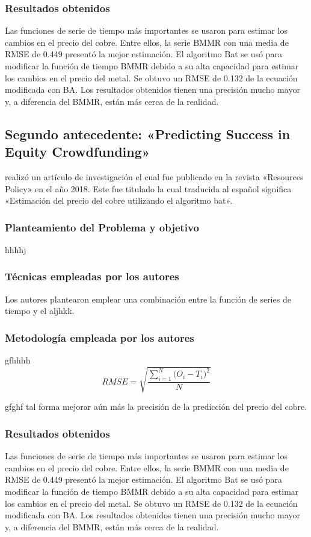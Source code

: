 \subsubsection{Resultados obtenidos}
Las funciones de serie de tiempo más importantes se usaron para estimar los cambios en el precio del cobre. Entre ellos, la serie BMMR con una media de RMSE de 0.449 presentó la mejor estimación. El algoritmo Bat  se usó para modificar la función de tiempo BMMR debido a su alta capacidad para estimar los cambios en el precio del metal. Se obtuvo un RMSE de 0.132 de la ecuación modificada con BA. Los resultados obtenidos tienen una precisión mucho mayor y, a diferencia del BMMR, están más cerca de la realidad.


\subsection{Segundo antecedente: «Predicting Success in Equity Crowdfunding» \citep*{pr_beckwith2016predcrowd}}
\citeauthor{pr_beckwith2016predcrowd} realizó un artículo de investigación el cual fue publicado en la revista «Resources Policy» en el año 2018. Este fue titulado  la cual traducida al español significa «Estimación del precio del cobre utilizando el algoritmo bat».

\subsubsection{Planteamiento del Problema y objetivo }
hhhhj

\subsubsection{Técnicas empleadas por los autores}
Los autores plantearon emplear una combinación entre la función de series de tiempo y el aljhkk. 

\subsubsection{Metodología empleada por los autores}
gfhhhh
\begin{equation}  
\label{eq:RMSE}
RMSE = \sqrt{\frac{\sum_{i=1}^{N}{\Big(O_i -T_i\Big)^2}}{N}}
\end{equation}

gfghf tal forma mejorar aún más la precisión de la predicción del precio del cobre.

\subsubsection{Resultados obtenidos}
Las funciones de serie de tiempo más importantes se usaron para estimar los cambios en el precio del cobre. Entre ellos, la serie BMMR con una media de RMSE de 0.449 presentó la mejor estimación. El algoritmo Bat  se usó para modificar la función de tiempo BMMR debido a su alta capacidad para estimar los cambios en el precio del metal. Se obtuvo un RMSE de 0.132 de la ecuación modificada con BA. Los resultados obtenidos tienen una precisión mucho mayor y, a diferencia del BMMR, están más cerca de la realidad.


